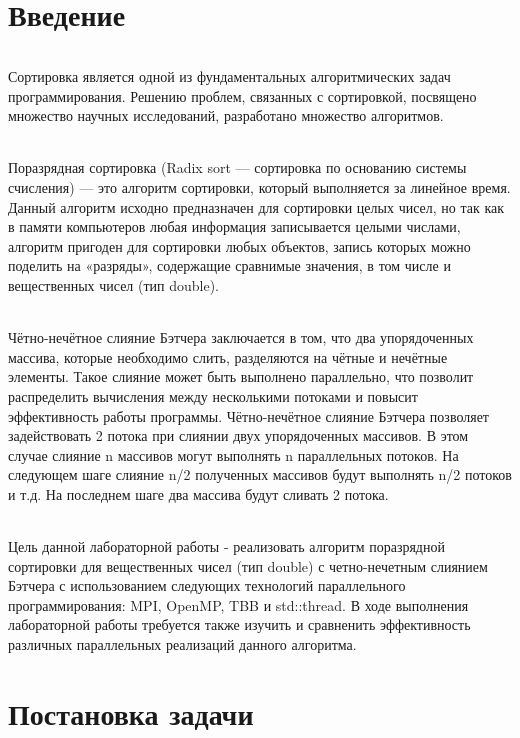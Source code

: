 \documentclass[12pt,a4paper]{article}
\begin{document}
\part*{Введение}
\paragraph{}Сортировка является одной из фундаментальных алгоритмических задач программирования. Решению проблем, связанных с сортировкой, посвящено множество научных исследований, разработано множество алгоритмов.
\paragraph{}Поразрядная сортировка (Radix sort — сортировка по основанию системы счисления) — это алгоритм сортировки, который выполняется за линейное время. Данный алгоритм исходно предназначен для сортировки целых чисел, но так как в памяти компьютеров любая информация записывается целыми числами, алгоритм пригоден для сортировки любых объектов, запись которых можно поделить на «разряды», содержащие сравнимые значения, в том числе и вещественных чисел (тип double).
\paragraph{}Чётно-нечётное слияние Бэтчера заключается в том, что два упорядоченных массива, которые необходимо слить, разделяются на чётные и нечётные элементы. Такое слияние может быть выполнено параллельно, что позволит распределить вычисления между несколькими потоками и повысит эффективность работы программы. Чётно-нечётное слияние Бэтчера позволяет задействовать 2 потока при слиянии двух упорядоченных массивов. В этом случае слияние n массивов могут выполнять n параллельных потоков. На следующем шаге слияние n/2 полученных массивов будут выполнять n/2 потоков и т.д. На последнем шаге два массива будут сливать 2 потока.
\paragraph{}Цель данной лабораторной работы - реализовать алгоритм поразрядной сортировки для вещественных чисел (тип double) с четно-нечетным слиянием Бэтчера с использованием следующих технологий параллельного программирования: MPI, OpenMP, TBB и std::thread. В ходе выполнения лабораторной работы требуется также изучить и сравненить эффективность различных параллельных реализаций данного алгоритма.

\newpage
\part*{Постановка задачи}
\end{document}

